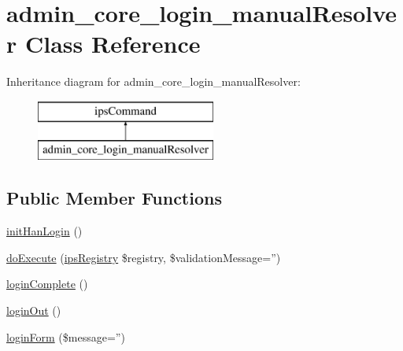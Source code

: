 \hypertarget{classadmin__core__login__manual_resolver}{\section{admin\-\_\-core\-\_\-login\-\_\-manual\-Resolver Class Reference}
\label{classadmin__core__login__manual_resolver}
}
Inheritance diagram for admin\-\_\-core\-\_\-login\-\_\-manual\-Resolver\-:\begin{figure}[H]
\begin{center}
\leavevmode
\includegraphics[height=2.000000cm]{classadmin__core__login__manual_resolver}
\end{center}
\end{figure}
\subsection*{Public Member Functions}
\begin{DoxyCompactItemize}
\item 
\hyperlink{classadmin__core__login__manual_resolver_a01d460c2ac8c3bc34a253f9fbc3f4dac}{init\-Han\-Login} ()
\item 
\hyperlink{classadmin__core__login__manual_resolver_adb8bbe1eb6cd7ea37438e1345ebb4a6c}{do\-Execute} (\hyperlink{classips_registry}{ips\-Registry} \$registry, \$validation\-Message='')
\item 
\hyperlink{classadmin__core__login__manual_resolver_a4dfa7e3a0e1dbbf01d7b9a7475289232}{login\-Complete} ()
\item 
\hyperlink{classadmin__core__login__manual_resolver_a447b7aefb551777a7b01e51aff674c14}{login\-Out} ()
\item 
\hyperlink{classadmin__core__login__manual_resolver_a9621e50eedff856c01265186974e1203}{login\-Form} (\$message='')
\end{DoxyCompactItemize}
